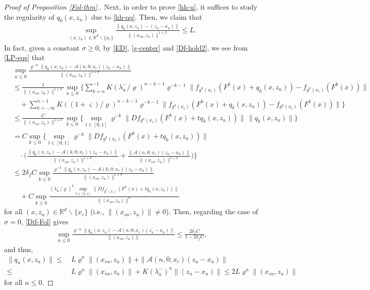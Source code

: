\documentclass[reqno]{amsart}
\numberwithin{equation}{section}
\begin{document}
\begin{proof}[Proof of Proposition {\rm \ref{Fol-thm}.}]
Next, in order to prove \eqref{hh-u}, it suffices to study the regularity of $q_0(x,z_u)$
due to \eqref{hh-qq}. Then, we claim that
\begin{align}\label{Diff-LP}
\sup_{(x,z_u)\in \mathbb{R}^d\backslash \{x_c\}} \frac{\|q_0(x,z_u)-(z_u-x_u) \|}{\|(x_{su},z_u)\|^{1+\beta}}\le L.
\end{align}
In fact, given a constant $\sigma \ge 0$, by \eqref{ED}, \eqref{g-center} and \eqref{Df-hold2},  we see from \eqref{LP-eqs} that
\begin{align}\label{Dif-Fol}
& \sup_{n\le 0}  \frac{\varrho^{-n}\|q_n(x,z_u)-\mathcal{A}(n,0;x_c)(z_u-x_u)\|}{\|(x_{su},z_u)\|^{1+\sigma}}
\nonumber\\
&\le \frac{1}{\|(x_{su},z_u)\|^{1+\sigma}}\sup_{n\le 0} \Bigg\{ \sum_{k=n}^{-1} K (\lambda_u^-/\varrho)^{n-k-1}
\varrho^{-k-1}
           \big\|   f_{g^k(x_c)} (F^k(x)+q_k(x,z_u))- f_{g^k(x_c)} (F^k(x))   \big\|
\nonumber\\
&\quad +\sum_{k=-\infty}^{n-1} K ((1+\varsigma)/\varrho)^{n-k-1}
\varrho^{-k-1} \big\| f_{g^k(x_c)} (F^k(x)+q_k(x,z_u))- f_{g^k(x_c)} (F^k(x))  \big\| \Bigg\}
\nonumber\\
&  \le \frac{C}{\|(x_{su},z_u)\|^{1+\sigma}}
\sup_{k\le 0} \bigg\{\sup_{t\in[0,1]} \varrho^{-k} \| Df_{g^k(x_c)}(F^k(x)+t q_k(x,z_u)) \|\,\|q_k(x,z_u)\|\bigg\}
\nonumber\\
&  =C\sup_{k\le 0} \Bigg\{\sup_{t\in[0,1]} \varrho^{-k} \big\| Df_{g^k(x_c)}(F^k(x)+t q_k(x,z_u)) \big\|
\nonumber\\
&\quad
\cdot\bigg( \frac{\|q_k(x,z_u)\!-\!\mathcal{A}(k,0;x_c)(z_u\!-\!x_u)\|}{\|(x_{su},z_u)\|^{1+\sigma}}
  \!+\! \frac{\|\mathcal{A}(n,0;x_c)(z_u\!-\!x_u)\|}{\|(x_{su},z_u)\|^{1+\sigma}} \bigg)\! \Bigg\}
\nonumber\\
&  \le 2\delta_f C \sup_{k\le 0}   \frac{\varrho^{-k}\|q_k(x,z_u)-\mathcal{A}(k,0;x_c)(z_u-x_u)\|}{\|(x_{su},z_u)\|^{1+\sigma}}
\nonumber\\
& \quad+C \sup_{k\le 0}  \frac{(\lambda_u^-/\varrho)^k\sup_{t\in[0,1]} \big\| Df_{g^k(x_c)}(F^n(x)+t q_n(x,z_u)) \big\| }{\|(x_{su},z_u)\|^{\sigma}}
\end{align}
for all $(x,z_u)\in \mathbb{R}^d\backslash\{x_c\}$ (i.e., $\|(x_{su},z_u)\|\ne 0$).
Then, regarding  the case of $\sigma=0$, \eqref{Dif-Fol} gives
\begin{align*}
\sup_{n\le 0} \frac{\varrho^{-n}\|q_n(x,z_u)-\mathcal{A} (n,0;x_c)(z_u-x_u)\|}{\|(x_{su},z_u)\|}
\le \frac{2\delta_fC}{1-2\delta_f C},
\end{align*}
and thus,
\begin{align}\label{Dif-Fo2}
\|q_n(x,z_u)\| \le&~  L\varrho^n\|(x_{su},z_u)\|  +   \|\mathcal{A}(n,0;x_c) (z_u-x_u)\|
\nonumber\\
\le&~ L \varrho^n    \|(x_{su},z_u)\|+ K  (\lambda_u^-)^n \|(z_u-x_u)\|
\le 2L \varrho^n  \|(x_{su},z_u)\|
\end{align}
for all $n\le 0$.


\end{proof}
\end{document}
